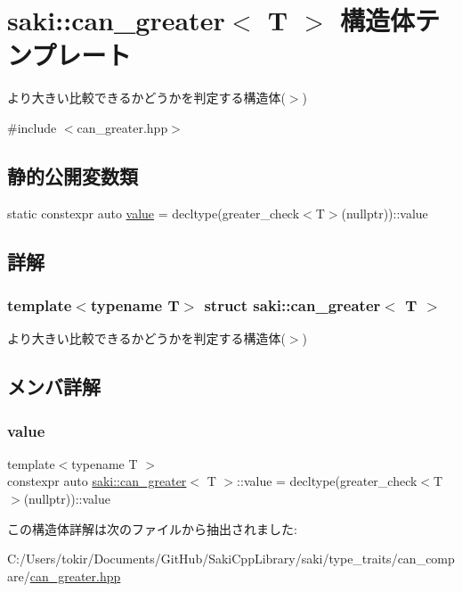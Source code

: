 \hypertarget{structsaki_1_1can__greater}{}\section{saki\+:\+:can\+\_\+greater$<$ T $>$ 構造体テンプレート}
\label{structsaki_1_1can__greater}


より大きい比較できるかどうかを判定する構造体($>$)  




{\ttfamily \#include $<$can\+\_\+greater.\+hpp$>$}

\subsection*{静的公開変数類}
\begin{DoxyCompactItemize}
\item 
static constexpr auto \mbox{\hyperlink{structsaki_1_1can__greater_a75ef553abd1f49c63f4d31fed7f1f51f}{value}} = decltype(greater\+\_\+check$<$T$>$(nullptr))\+::value
\end{DoxyCompactItemize}


\subsection{詳解}
\subsubsection*{template$<$typename T$>$\newline
struct saki\+::can\+\_\+greater$<$ T $>$}

より大きい比較できるかどうかを判定する構造体($>$) 

\subsection{メンバ詳解}
\mbox{\label{structsaki_1_1can__greater_a75ef553abd1f49c63f4d31fed7f1f51f}} 
\subsubsection{\texorpdfstring{value}{value}}
{\footnotesize\ttfamily template$<$typename T $>$ \\
constexpr auto \mbox{\hyperlink{structsaki_1_1can__greater}{saki\+::can\+\_\+greater}}$<$ T $>$\+::value = decltype(greater\+\_\+check$<$T$>$(nullptr))\+::value\hspace{0.3cm}{\ttfamily [static]}}



この構造体詳解は次のファイルから抽出されました\+:\begin{DoxyCompactItemize}
\item 
C\+:/\+Users/tokir/\+Documents/\+Git\+Hub/\+Saki\+Cpp\+Library/saki/type\+\_\+traits/can\+\_\+compare/\mbox{\hyperlink{can__greater_8hpp}{can\+\_\+greater.\+hpp}}\end{DoxyCompactItemize}

